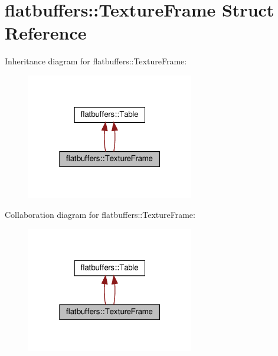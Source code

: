 \hypertarget{structflatbuffers_1_1TextureFrame}{}\section{flatbuffers\+:\+:Texture\+Frame Struct Reference}
\label{structflatbuffers_1_1TextureFrame}


Inheritance diagram for flatbuffers\+:\+:Texture\+Frame\+:
\nopagebreak
\begin{figure}[H]
\begin{center}
\leavevmode
\includegraphics[width=207pt]{structflatbuffers_1_1TextureFrame__inherit__graph}
\end{center}
\end{figure}


Collaboration diagram for flatbuffers\+:\+:Texture\+Frame\+:
\nopagebreak
\begin{figure}[H]
\begin{center}
\leavevmode
\includegraphics[width=207pt]{structflatbuffers_1_1TextureFrame__coll__graph}
\end{center}
\end{figure}
